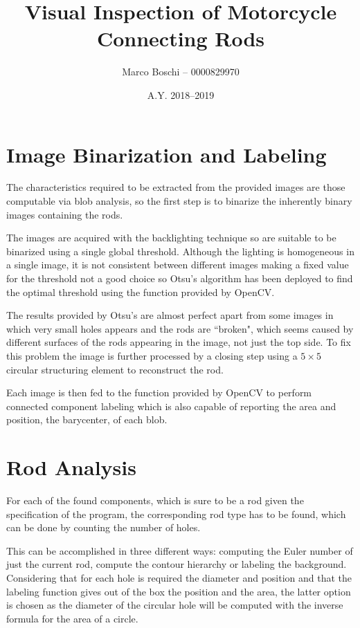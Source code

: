

\title{Visual Inspection of Motorcycle Connecting Rods}
\date{A.Y. 2018--2019}
\author{Marco Boschi -- 0000829970}




\section{Image Binarization and Labeling}
The characteristics required to be extracted from the provided images are those computable via blob analysis, so the first step is to binarize the inherently binary images containing the rods.

The images are acquired with the backlighting technique so are suitable to be binarized using a single global threshold.
Although the lighting is homogeneous in a single image, it is not consistent between different images making a fixed value for the threshold not a good choice so Otsu's algorithm has been deployed to find the optimal threshold using the function provided by OpenCV.

The results provided by Otsu's are almost perfect apart from some images in which very small holes appears and the rods are ``broken", which seems caused by different surfaces of the rods appearing in the image, not just the top side.
To fix this problem the image is further processed by a closing step using a $5\times 5$ circular structuring element to reconstruct the rod.

Each image is then fed to the function provided by OpenCV to perform connected component labeling which is also capable of reporting the area and position, \ie the barycenter, of each blob.

\section{Rod Analysis}
For each of the found components, which is sure to be a rod given the specification of the program, the corresponding rod type has to be found, which can be done by counting the number of holes.

This can be accomplished in three different ways: computing the Euler number of just the current rod, compute the contour hierarchy or labeling the background.
Considering that for each hole is required the diameter and position and that the labeling function gives out of the box the position and the area, the latter option is chosen as the diameter of the circular hole will be computed with the inverse formula for the area of a circle.


